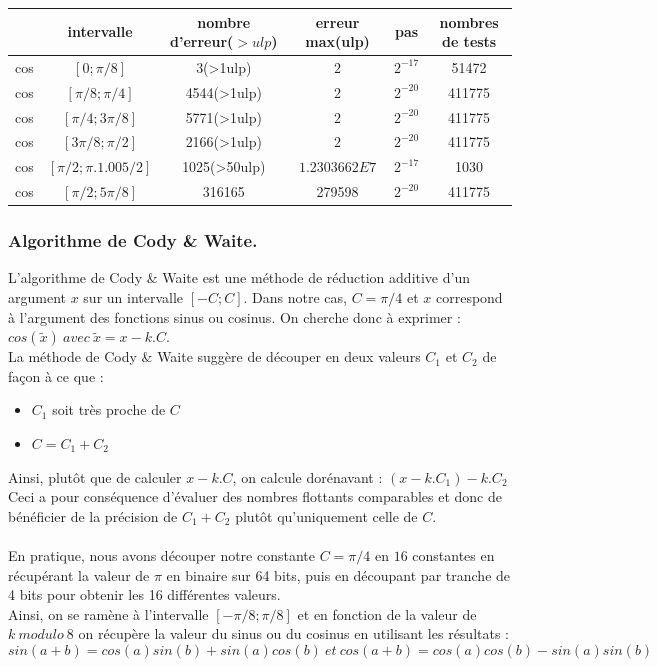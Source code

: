 \documentclass[a4,12pt]{article}
\begin{document}
\hspace{-2cm}\begin{tabular}{|c|c|c|c|c|c|}

\hline 
 & intervalle & nombre d'erreur($ >  ulp$) & erreur max(ulp) & pas & nombres de tests \\
\hline
cos & $[0;\pi /8]$ & 3(>1ulp) & $2$ & $2^{-17}$ & 51472\\
\hline
cos & $[\pi /8;\pi /4]$ & 4544(>1ulp) & $2$ & $2^{-20}$ & 411775\\
\hline
cos & $[\pi /4;3\pi /8]$ & 5771(>1ulp) & $2$ & $2^{-20}$ & 411775\\
\hline
cos & $[3\pi /8;\pi /2]$ & 2166(>1ulp) & $2$ & $2^{-20}$ & 411775\\
\hline
cos & $[\pi /2;\pi .1.005/2]$ & 1025(>50ulp) & $1.2303662E7$ & $2^{-17}$ & 1030\\
\hline
cos & $[\pi /2;5\pi /8]$ & 316165 & 279598 & $2^{-20}$ & 411775\\
\hline
\end{tabular}


\subsubsection{Algorithme de Cody \& Waite.}
L'algorithme de Cody \& Waite est une méthode de réduction additive d'un argument $x$ sur un intervalle $[-C ; C]$.
Dans notre cas, $C = \pi /4$ et $x$ correspond à l'argument des fonctions sinus ou cosinus. On cherche donc à exprimer : 
$ cos(\tilde x) \ avec \ \tilde x = x - k.C $. \\
La méthode de Cody \& Waite suggère de découper en deux valeurs $C_{1}$ et $C_{2}$ de façon à ce que : 
\begin{itemize}
    \item $C_{1}$ soit très proche de $C$
    \item $C =C_{1} + C_{2} $
\end{itemize}
Ainsi, plutôt que de calculer $ x -k.C $, on calcule dorénavant : $ (x - k.C_{1}) - k.C_{2} $ \\
Ceci a pour conséquence d'évaluer des nombres flottants comparables et donc de bénéficier de la précision de $C_{1} + C_{2}$ 
plutôt qu'uniquement celle de $C$.\\
\\
En pratique, nous avons découper notre constante $C = \pi /4$ en $16$ constantes en récupérant la valeur de $\pi$ en binaire sur 64 bits, puis en découpant par tranche de 4 bits pour obtenir les 16 différentes valeurs.\\
Ainsi, on se ramène à l'intervalle $[-\pi /8 ; \pi / 8]$ et en fonction de la valeur de $k\ modulo\ 8$ on récupère la valeur du sinus ou du cosinus en utilisant les résultats : $$ sin( a + b ) = cos(a)sin(b) + sin(a)cos(b) \ et \ cos(a + b) = cos(a)cos(b) - sin(a)sin(b) $$
\end{document}
